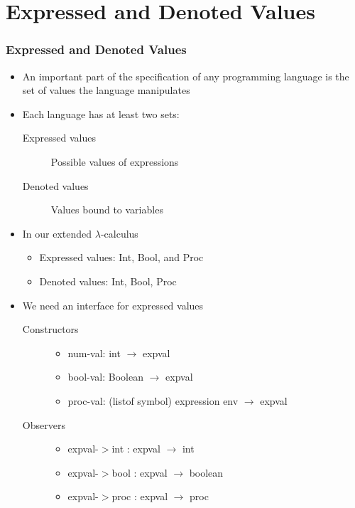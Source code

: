 \documentclass{beamer}
\newcommand{\arrow}{\(\rightarrow\)}
\begin{document}
\section{Expressed and Denoted Values}

\begin{frame}[fragile]
\frametitle{Expressed and Denoted Values}
\begin{scriptsize}
\begin{itemize}
\item<1-> An important part of the specification of any programming language is the set of values the language manipulates

\item<2-> Each language has at least two sets:
  \begin{description}
    \item[Expressed values] Possible values of expressions
    \item[Denoted values] Values bound to variables
  \end{description}

\item<3-> In our extended $\lambda$-calculus
 \begin{itemize}
   \item Expressed values: Int, Bool, and Proc
   \item Denoted values: Int, Bool, Proc
 \end{itemize}

\item<4-> We need an interface for expressed values
  \begin{description}
    \item[Constructors]
      \begin{itemize}
        \item num-val: int \arrow{} expval
        \item bool-val: Boolean \arrow{} expval
        \item proc-val: (listof symbol) expression env \arrow{} expval
      \end{itemize}
    \item[Observers]
      \begin{itemize}
        \item expval-$>$int : expval \arrow{} int
        \item expval-$>$bool : expval \arrow{} boolean
        \item expval-$>$proc : expval \arrow{} proc
      \end{itemize}
  \end{description}

\end{itemize}
\end{scriptsize}
\end{frame}
\end{document}
